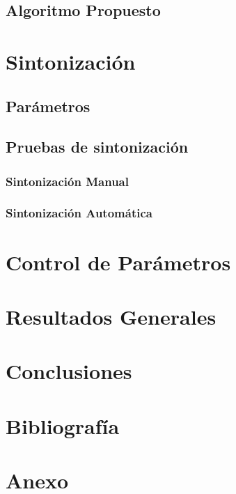 \documentclass[letter, 10pt]{article}
\begin{document}
\newpage
\subsection{Algoritmo Propuesto}
\label{sec:propuesta}



\newpage
\section{Sintonización}
\label{sec:sintonizacion}

\subsection{Parámetros}
\label{sec:parametros}


\newpage
\subsection{Pruebas de sintonización}
\label{sec:pruebasSintonizacion}
\subsubsection{Sintonización Manual}

\subsubsection{Sintonización Automática}


\newpage
\section{Control de Parámetros}
\label{sec:control}


\newpage
\section{Resultados Generales}
\label{sec:resultados}


\newpage
\section{Conclusiones}
\label{sec:conclusiones}


\newpage
\section{Bibliografía}


\newpage
\section{Anexo}
\label{sec:anexo}

\end{document}

